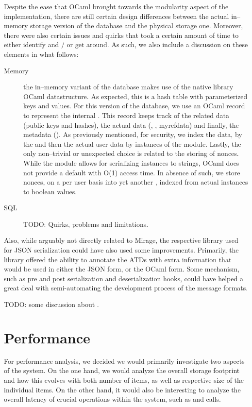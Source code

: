 Despite the ease that OCaml brought towards the modularity aspect of the implementation, there are still certain design differences between the actual in--memory storage version of the database and the physical storage one.
Moreover, there were also certain issues and quirks that took a certain amount of time to either identify and / or get around.
As such, we also include a discussion on these elements in what follows:
\begin{description}
  \item[Memory] the in--memory variant of the database makes use of the native library OCaml  datastructure.
  As expected, this is a hash table with parameterized keys and values.
  For this version of the database, we use an OCaml record to represent the internal .
  This record keeps track of the  related data (public keys and hashes), the actual data (, , myref{data}) and finally, the metadata ().
  As previously mentioned, for security, we index the  data, by the  and then the actual user data by instances of the  module.
  Lastly, the only non--trivial or unexpected choice is related to the storing of nonces.
  While the  module allows for serializing instances to strings, OCaml does not provide a default  with O(1) access time.
  In absence of such, we store nonces, on a per user basis into yet another , indexed from actual  instances to boolean values.

  \item[SQL] TODO: Quirks, problems and limitations.
\end{description}

Also, while arguably not directly related to Mirage, the respective library used for JSON serialization could have also used some improvements.
Primarily, the library offered the ability to annotate the ATDs with extra information that would be used in either the JSON form, or the OCaml form.
Some mechanism, such as pre and post serialization and deserialization hooks, could have helped a great deal with semi-automating the development process of the message formats.

TODO: some discussion about .

\section{Performance}
For performance analysis, we decided we would primarily investigate two aspects of the system.
On the one hand, we would analyze the overall storage footprint and how this evolves with both number of items, as well as respective size of the individual items.
On the other hand, it would also be interesting to analyze the overall latency of crucial operations within the system, such as  and  calls.

